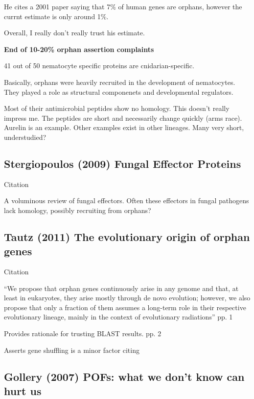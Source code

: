     He cites a 2001 paper saying that 7\% of human genes are orphans,
    however the currnt estimate is only around 1\%.

    Overall, I really don't really trust his estimate. 

    \textbf{End of 10-20\% orphan assertion complaints}

    41 out of 50 nematocyte specific proteins are cnidarian-specific.
    \cite{hwang_evolutionary_2007}

    Basically, orphans were heavily recruited in the development of
    nematocytes. They played a role as structural componenets and
    developmental regulators.

    Most of their antimicrobial peptides show no homology. This doesn't
    really impress me. The peptides are short and necessarily change
    quickly (arms race). Aurelin is an example. Other examples exist in
    other lineages. Many very short, understudied?




\subsection{Stergiopoulos (2009) Fungal Effector Proteins}

    Citation \cite{stergiopoulos_fungal_2009}

    A voluminous review of fungal effectors. Often these effectors in fungal
    pathogens lack homology, possibly recruiting from orphans?

\subsection{Tautz (2011) The evolutionary origin of orphan genes}

    Citation \cite{tautz_evolutionary_2011}

    ``We propose that orphan genes continuously arise in any genome and
    that, at least in eukaryotes, they arise mostly through de novo
    evolution; however, we also propose that only a fraction of them
    assumes a long-term role in their respective evolutionary lineage,
    mainly in the context of evolutionary radiations'' pp. 1

    Provides rationale for trusting BLAST results. pp. 2

    Asserts gene shuffling is a minor factor citing \cite{}

\subsection{Gollery (2007) POFs: what we don’t know can hurt us}

